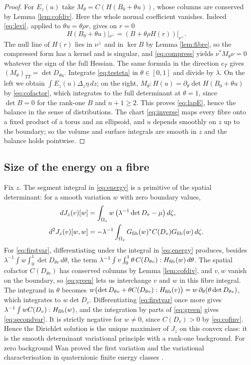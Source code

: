 \begin{proof}
For $E_z(u)$ take $M_\theta=C(H(B_0+\theta u))$, whose columns are conserved by Lemma
\ref{lem:cofdiv}. Here the whole normal coefficient vanishes. Indeed \eqref{eq:levi}, applied to
$\theta u=\theta\rho r$, gives on $r=0$
\[
H(B_0+\theta u)|_{\nu^\perp}=(B+\theta\rho H(r))|_{\nu^\perp}.
\]
The null line of $H(r)$ lies in $\nu^\perp$ and in $\ker B$ by Lemma \ref{lem:fibre}, so the
compressed form has a kernel and is singular, and \eqref{eq:compress} yields
$\nu^*M_\theta\nu=0$ whatever the sign of the full Hessian. The same formula in the direction
$e_T$ gives $(M_\theta)_{TT}=\det D_{\theta u}$. Integrate \eqref{eq:testeta} in $\theta\in[0,1]$ and
divide by $\lambda$. On the left we obtain $\int E_z(u)\Delta_z\eta\,dz$; on the right,
$M_\theta:H(u)=\partial_\theta\det H(B_0+\theta u)$ by \eqref{eq:cofactor}, which integrates to the
full determinant at $\theta=1$, since $\det B=0$ for the rank-one $B$ and $n+1\ge2$. This
proves \eqref{eq:lapE}, hence the balance in the sense of distributions. The chart
\eqref{eq:inverse} maps every fibre onto a fixed product of a torus and an ellipsoid, and $u$
depends smoothly on $z$ up to the boundary; so the volume and surface integrals are smooth in
$z$ and the balance holds pointwise.
\end{proof}

\subsection{Size of the energy on a fibre}\label{ssec:size}
Fix $z$. The segment integral in \eqref{eq:energy} is a primitive of the spatial determinant: for
a smooth variation $w$ with zero boundary values,
\begin{align}
dJ_z(v)[w]&=\int_{\Omega_z}w\,\bigl(\lambda^{-1}\det D_v-\mu\bigr)\,d\zeta,\label{eq:firstvar}\\
d^2J_z(v)[w,w]&=-\lambda^{-1}\int_{\Omega_z}G_{\mathrm{fib}}(w)^*C(D_v)G_{\mathrm{fib}}(w)\,d\zeta .\label{eq:secondvar}
\end{align}
For \eqref{eq:firstvar}, differentiating under the integral in \eqref{eq:energy} produces, besides
$\lambda^{-1}\int w\int_0^1\det D_{\theta v}\,d\theta$, the term
$\lambda^{-1}\int v\int_0^1\theta\,C(D_{\theta v}):H_{\mathrm{fib}}(w)\,d\theta$. The spatial cofactor
$C(D_{\theta v})$ has conserved columns by Lemma \ref{lem:cofdiv}, and $v,w$ vanish on the
boundary, so \eqref{eq:green} lets us interchange $v$ and $w$ in this fibre integral. The
integrand in $\theta$ becomes
$w\bigl(\det D_{\theta v}+\theta C(D_{\theta v}):H_{\mathrm{fib}}(v)\bigr)=w\,\partial_\theta(\theta\det D_{\theta v})$,
which integrates to $w\det D_v$. Differentiating \eqref{eq:firstvar} once more gives
$\lambda^{-1}\int wC(D_v):H_{\mathrm{fib}}(w)$, and the integration by parts of \eqref{eq:green} gives
\eqref{eq:secondvar}. It is strictly negative for $w\ne0$, since $C(D_v)>0$ by
\eqref{eq:cofinv}. Hence the Dirichlet solution is the unique maximiser of $J_z$ on this convex
class: it is the smooth determinant variational principle with a rank-one background. For zero
background Wan proved the first variation and the variational characterisation in quaternionic
finite energy classes \cite[\S4]{Wan20}.

